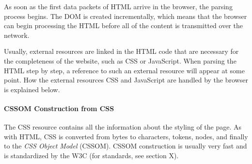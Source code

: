 


As soon as the first data packets of HTML arrive in the browser, the parsing process begins. %
The DOM is created incrementally, which means that the browser can begin processing the HTML before all of the content is transmitted over the network.



Usually, external resources are linked in the HTML code that are necessary for the completeness of the website, such as CSS or JavaScript.
When parsing the HTML step by step, a reference to such an external resource will appear at some point.
How the external resources CSS and JavaScript are handled by the browser is explained below.






\paragraph{CSSOM Construction from CSS} %


The CSS resource contains all the information about the styling of the page.
As with HTML, CSS is converted from bytes to characters, tokens, nodes, and finally to the \textit{CSS Object Model} (CSSOM). %
CSSOM construction is usually very fast %
and is standardized by the W3C (for standards, see section X).%

